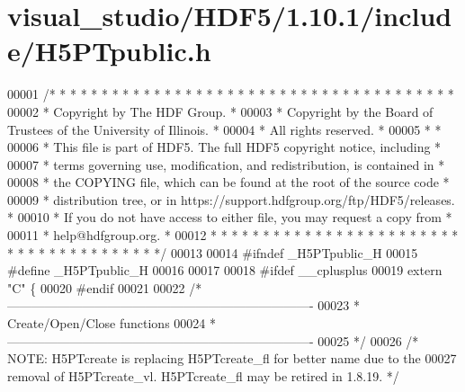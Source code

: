 \hypertarget{visual__studio_2_h_d_f5_21_810_81_2include_2_h5_p_tpublic_8h_source}{}\section{visual\+\_\+studio/\+H\+D\+F5/1.10.1/include/\+H5\+P\+Tpublic.h}
\label{visual__studio_2_h_d_f5_21_810_81_2include_2_h5_p_tpublic_8h_source}

\begin{DoxyCode}
00001 \textcolor{comment}{/* * * * * * * * * * * * * * * * * * * * * * * * * * * * * * * * * * * * * * *}
00002 \textcolor{comment}{ * Copyright by The HDF Group.                                               *}
00003 \textcolor{comment}{ * Copyright by the Board of Trustees of the University of Illinois.         *}
00004 \textcolor{comment}{ * All rights reserved.                                                      *}
00005 \textcolor{comment}{ *                                                                           *}
00006 \textcolor{comment}{ * This file is part of HDF5.  The full HDF5 copyright notice, including     *}
00007 \textcolor{comment}{ * terms governing use, modification, and redistribution, is contained in    *}
00008 \textcolor{comment}{ * the COPYING file, which can be found at the root of the source code       *}
00009 \textcolor{comment}{ * distribution tree, or in https://support.hdfgroup.org/ftp/HDF5/releases.  *}
00010 \textcolor{comment}{ * If you do not have access to either file, you may request a copy from     *}
00011 \textcolor{comment}{ * help@hdfgroup.org.                                                        *}
00012 \textcolor{comment}{ * * * * * * * * * * * * * * * * * * * * * * * * * * * * * * * * * * * * * * */}
00013 
00014 \textcolor{preprocessor}{#ifndef \_H5PTpublic\_H}
00015 \textcolor{preprocessor}{#define \_H5PTpublic\_H}
00016 
00017 
00018 \textcolor{preprocessor}{#ifdef \_\_cplusplus}
00019 \textcolor{keyword}{extern} \textcolor{stringliteral}{"C"} \{
00020 \textcolor{preprocessor}{#endif}
00021 
00022 \textcolor{comment}{/*-------------------------------------------------------------------------}
00023 \textcolor{comment}{ * Create/Open/Close functions}
00024 \textcolor{comment}{ *-------------------------------------------------------------------------}
00025 \textcolor{comment}{ */}
00026 \textcolor{comment}{/* NOTE: H5PTcreate is replacing H5PTcreate\_fl for better name due to the}
00027 \textcolor{comment}{   removal of H5PTcreate\_vl.  H5PTcreate\_fl may be retired in 1.8.19. */}

\end{DoxyCode}
